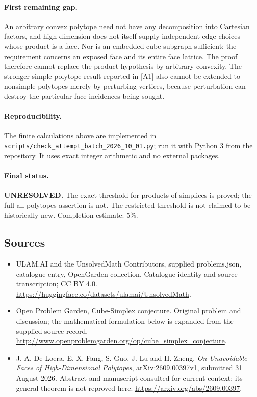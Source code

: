 \documentclass[11pt,a4paper]{article}
\begin{document}
\paragraph{First remaining gap.}
An arbitrary convex polytope need not have any decomposition into Cartesian
factors, and high dimension does not itself supply independent edge choices
whose product is a face. Nor is an embedded cube subgraph sufficient: the
requirement concerns an exposed face and its entire face lattice. The proof
therefore cannot replace the product hypothesis by arbitrary convexity.
The stronger simple-polytope result reported in [A1] also cannot be extended
to nonsimple polytopes merely by perturbing vertices, because perturbation
can destroy the particular face incidences being sought.

\paragraph{Reproducibility.}
The finite calculations above are implemented in
\texttt{scripts/check\_attempt\_batch\_2026\_10\_01.py}; run it with Python 3
from the repository. It uses exact integer arithmetic and no external packages.

\paragraph{Final status.}
\textbf{UNRESOLVED.} The exact threshold for products of simplices is proved;
the full all-polytopes assertion is not. The restricted threshold is not
claimed to be historically new. Completion estimate: 5\%.

\subsection{Sources}
\begin{itemize}
\item[S1] ULAM.AI and the UnsolvedMath Contributors, supplied problems.json, catalogue entry, OpenGarden collection. Catalogue identity and source transcription; CC BY 4.0.
\url{https://huggingface.co/datasets/ulamai/UnsolvedMath}.
\item[S2] Open Problem Garden, Cube-Simplex conjecture. Original problem and discussion; the mathematical formulation below is expanded from the supplied source record.
\url{http://www.openproblemgarden.org/op/cube_simplex_conjecture}.
\item[A1] J. A. De Loera, E. X. Fang, S. Guo, J. Lu and H. Zheng, \emph{On Unavoidable Faces of High-Dimensional Polytopes}, arXiv:2609.00397v1, submitted 31 August 2026. Abstract and manuscript consulted for current context; its general theorem is not reproved here. \url{https://arxiv.org/abs/2609.00397}.
\end{itemize}
\end{document}
